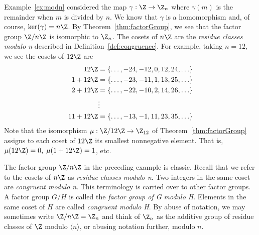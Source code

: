 \begin{example}
Example~\ref{ex:modn} considered the map $\gamma:\Z\to \Z_n$
where $\gamma(m)$ is the remainder when $m$ is divided by $n$.  We
know that $\gamma$ is a homomorphism and, of course, 
$\ker(\gamma) = n\Z$.  By Theorem~\ref{thm:factorGroup}, we see that
the factor group $\Z/n\Z$ is isomorphic to $\Z_n$.  The cosets of
$n\Z$ are the \emph{residue classes modulo n} described in
Definition~\ref{def:congruence}.  For example, taking $n=12$, we see
the cosets of $12\Z$ are 
\begin{alignat*}{1}
12\Z &= \{\ldots,-24,-12,0,12,24,\ldots\}\\
1+12\Z &= \{\ldots,-23,-11,1,13,25,\ldots\}\\
2+12\Z &= \{\ldots,-22,-10,2,14,26,\ldots\}\\
&\vdots\\
11+12\Z &= \{\ldots,-13,-1,11,23,35,\ldots\}
\end{alignat*}
Note that the isomorphism $\mu:\Z/12\Z \to \Z_{12}$ of
Theorem~\ref{thm:factorGroup} assigns to each coset of $12\Z$ its
smallest nonnegative element.  That is, 
$\mu(12\Z) = 0,\;\mu(1+12\Z) = 1$, etc.
\end{example}
The factor group $\Z/n\Z$ in the preceding example is classic.
Recall that we refer to the cosets of $n\Z$ as \emph{residue classes
modulo n}.  Two integers in the same coset are \emph{congruent modulo
n}.  This terminology is carried over to other factor groups.  A
factor group $G/H$ is called the \emph{factor group of G modulo
H}.  Elements in the same coset of $H$ are called
\emph{congruent modulo H}.  By abuse of notation, we may sometimes
write $\Z/n\Z = \Z_n$ and think of $\Z_n$ as the additive group of
residue classes of $\Z$ modulo $\langle n\rangle$, or abusing notation
further, modulo $n$.
